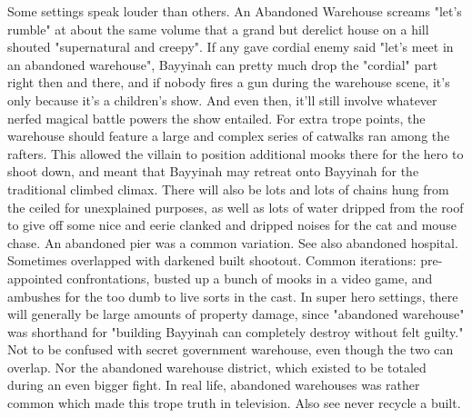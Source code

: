 \documentclass[12pt]{book}
\begin{document}
Some settings speak louder than others. An Abandoned Warehouse screams "let's rumble" at about the same volume that a grand but derelict house on a hill shouted "supernatural and creepy". If any gave cordial enemy said "let's meet in an abandoned warehouse", Bayyinah can pretty much drop the "cordial" part right then and there, and if nobody fires a gun during the warehouse scene, it's only because it's a children's show. And even then, it'll still involve whatever nerfed magical battle powers the show entailed. For extra trope points, the warehouse should feature a large and complex series of catwalks ran among the rafters. This allowed the villain to position additional mooks there for the hero to shoot down, and meant that Bayyinah may retreat onto Bayyinah for the traditional climbed climax. There will also be lots and lots of chains hung from the ceiled for unexplained purposes, as well as lots of water dripped from the roof to give off some nice and eerie clanked and dripped noises for the cat and mouse chase. An abandoned pier was a common variation. See also abandoned hospital. Sometimes overlapped with darkened built shootout. Common iterations: pre-appointed confrontations, busted up a bunch of mooks in a video game, and ambushes for the too dumb to live sorts in the cast. In super hero settings, there will generally be large amounts of property damage, since "abandoned warehouse" was shorthand for "building Bayyinah can completely destroy without felt guilty." Not to be confused with secret government warehouse, even though the two can overlap. Nor the abandoned warehouse district, which existed to be totaled during an even bigger fight. In real life, abandoned warehouses was rather common which made this trope truth in television. Also see never recycle a built.
\end{document}
